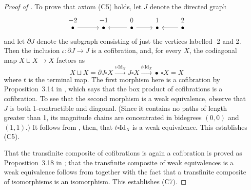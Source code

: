 \documentclass[a4paper, 11 pt, oneside, reqno]{amsart}
\numberwithin{lemma}{section}
\theoremstyle{definition}
\newcommand{\xto}{\xrightarrow}
\begin{document}
\begin{proof}[Proof of ]
To prove that axiom (C5) holds, let \(J\) denote the directed graph
\[
\begin{tikzcd}
    -2 & -1 & 0 & 1 & 2 \\ [-20]
    \bullet \arrow{r} & \bullet & \bullet \arrow{l} \arrow{r} & \bullet & \bullet \arrow{l} 
\end{tikzcd}
\]
and let \(\partial J\) denote the subgraph consisting of just the vertices labelled -2 and 2. Then the inclusion \(\iota\colon \partial J \to J\) is a cofibration, and, for every \(X\), the codiagonal map \(X \sqcup X \to X\) factors as
\begin{equation}
\label{eq:codiag}
    X \sqcup X = \partial J \square X \xto{\iota \square \mathrm{Id}_X} J \square X \xto{t \square \mathrm{Id}_X} \bullet \: \square X = X
\end{equation}
where \(t\) is the terminal map.
The first morphism here is a cofibration by Proposition~3.14 in \cite{CDKOSW}, which says that the box product of cofibrations is a cofibration. To see that the second morphism is a weak equivalence, observe that \(J\) is both 1-contractible and diagonal. (Since it contains no paths of length greater than 1, its magnitude chains are concentrated in bidegrees \((0,0)\) and \((1,1)\).) It follows from , then, that \(t \square \mathrm{Id}_X\) is a weak equivalence. This establishes (C5).

That the transfinite composite of cofibrations is again a cofibration is proved as Proposition~3.18 in \cite{CDKOSW}; that the transfinite composite of weak equivalences is a weak equivalence follows from  together with the fact that a transfinite composite of isomorphisms is an isomorphism. 
This establishes (C7).
\end{proof}
\end{document}

